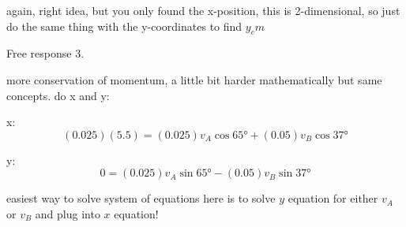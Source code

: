 \documentclass[]{article}
\begin{document}
again, right idea, but you only found the x-position, this is 2-dimensional, so just do the same thing with the y-coordinates to find $y_cm$

Free response 3. 

more conservation of momentum, a little bit harder mathematically but same concepts. do x and y: 

x:
$$ (0.025)(5.5) = (0.025)v_A \cos{\ang{65}} + (0.05)v_B \cos{\ang{37}} $$ 

y:
$$ 0 = (0.025)v_A \sin{\ang{65}} - (0.05)v_B \sin{\ang{37}} $$ 

easiest way to solve system of equations here is to solve $y$ equation for either $v_A$ or $v_B$ and plug into $x$ equation! 
\end{document}
